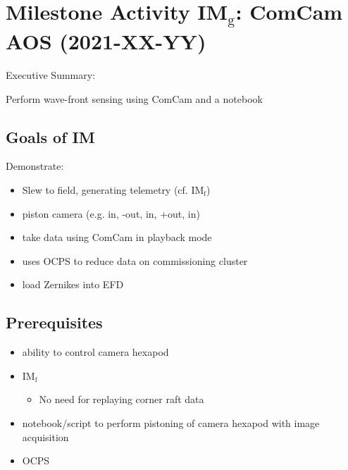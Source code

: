 \section{Milestone Activity IM\(_{\text{g}}\): ComCam AOS                          (2021-XX-YY)}
\label{sec:org617c29d}
Executive Summary:

Perform wave-front sensing using ComCam and a notebook

\subsection{Goals of IM}
Demonstrate:
\begin{itemize}
\item Slew to field, generating telemetry (cf. IM\(_{\text{f}}\))
\item piston camera (e.g. in, -out, in, +out, in)
\item take data using ComCam in playback mode
\item uses \gls{OCPS} to reduce data on commissioning cluster
\item load Zernikes into EFD
\end{itemize}

\subsection{Prerequisites}
\begin{itemize}
\item ability to control camera hexapod
\item IM\(_{\text{f}}\)
  \begin{itemize}
  \item No need for replaying corner raft data
  \end{itemize}
\item notebook/script to perform pistoning of camera hexapod with image acquisition
\item \gls{OCPS}
\end{itemize}
